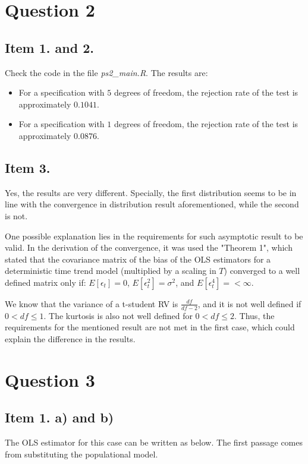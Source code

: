 \documentclass[12pt]{article}
\begin{document}
\section*{Question 2}

\subsection*{Item 1. and 2.}
Check the code in the file \textit{ps2\_main.R}. The results are:

\begin{itemize}
    \item For a specification with $5$ degrees of freedom, the rejection rate of the test is approximately $0.1041$.
    \item For a specification with $1$ degrees of freedom, the rejection rate of the test is approximately $0.0876$.
\end{itemize}


\subsection*{Item 3.}

Yes, the results are very different. Specially, the first distribution seems to be in line with the convergence in distribution result aforementioned, while the second is not.

One possible explanation lies in the requirements for such asymptotic result to be valid. In the derivation of the convergence, it was used the "Theorem 1", which stated that the covariance matrix of the bias of the OLS estimators for a deterministic time trend model (multiplied by a scaling in $T$) converged to a well defined matrix only if: $E[\epsilon_t] = 0$, $E[\epsilon^2_t] = \sigma^2$, and  $E[\epsilon^4_t] = < \infty$.

We know that the variance of a t-student RV is $\frac{df}{df-2}$, and it is not well defined if $0 < df \leq 1$. The kurtosis is also not well defined for $0 < df \leq 2$. Thus, the requirements for the mentioned result are not met in the first case, which could explain the difference in the results.



\section*{Question 3}

\subsection*{Item 1. a) and b)}
The OLS estimator for this case can be written as below. The first passage comes from substituting the populational model.
\end{document}
